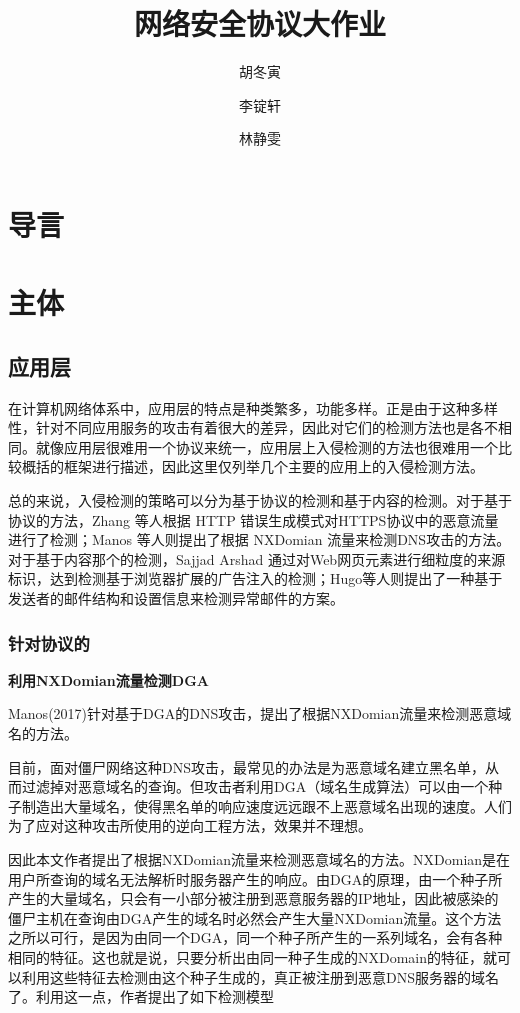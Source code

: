 \documentclass[12pt]{article} %
\title{网络安全协议大作业}
\author{胡冬寅 \and 李锭轩 \and 林静雯}
\date{} %
\begin{document}
\maketitle

\section{导言}

\section{主体}
\label{main}

\subsection{应用层}
\label{app}

在计算机网络体系中，应用层的特点是种类繁多，功能多样。正是由于这种多样性，针对不同应用服务的攻击有着很大的差异，因此对它们的检测方法也是各不相同。就像应用层很难用一个协议来统一，应用层上入侵检测的方法也很难用一个比较概括的框架进行描述，因此这里仅列举几个主要的应用上的入侵检测方法。

总的来说，入侵检测的策略可以分为基于协议的检测和基于内容的检测。对于基于协议的方法，Zhang 等人根据 HTTP 错误生成模式对HTTPS协议中的恶意流量进行了检测；Manos 等人则提出了根据 NXDomian 流量来检测DNS攻击的方法。对于基于内容那个的检测，Sajjad Arshad 通过对Web网页元素进行细粒度的来源标识，达到检测基于浏览器扩展的广告注入的检测；Hugo等人则提出了一种基于发送者的邮件结构和设置信息来检测异常邮件的方案。



\subsubsection{针对协议的}
\label{protocol}

\textbf{利用NXDomian流量检测DGA}


Manos(2017)\cite{Manos}针对基于DGA的DNS攻击，提出了根据NXDomian流量来检测恶意域名的方法。

目前，面对僵尸网络这种DNS攻击，最常见的办法是为恶意域名建立黑名单，从而过滤掉对恶意域名的查询。但攻击者利用DGA（域名生成算法）可以由一个种子制造出大量域名，使得黑名单的响应速度远远跟不上恶意域名出现的速度。人们为了应对这种攻击所使用的逆向工程方法，效果并不理想。

因此本文作者提出了根据NXDomian流量来检测恶意域名的方法。NXDomian是在用户所查询的域名无法解析时服务器产生的响应。由DGA的原理，由一个种子所产生的大量域名，只会有一小部分被注册到恶意服务器的IP地址，因此被感染的僵尸主机在查询由DGA产生的域名时必然会产生大量NXDomian流量。这个方法之所以可行，是因为由同一个DGA，同一个种子所产生的一系列域名，会有各种相同的特征。这也就是说，只要分析出由同一种子生成的NXDomain的特征，就可以利用这些特征去检测由这个种子生成的，真正被注册到恶意DNS服务器的域名了。利用这一点，作者提出了如下检测模型
\end{document}
